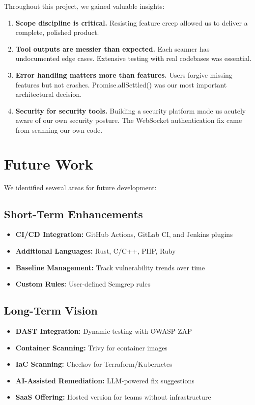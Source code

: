 \documentclass[12pt,a4paper]{report}
\begin{document}
Throughout this project, we gained valuable insights:

\begin{enumerate}
    \item \textbf{Scope discipline is critical.} Resisting feature creep allowed us to deliver a complete, polished product.

    \item \textbf{Tool outputs are messier than expected.} Each scanner has undocumented edge cases. Extensive testing with real codebases was essential.

    \item \textbf{Error handling matters more than features.} Users forgive missing features but not crashes. Promise.allSettled() was our most important architectural decision.

    \item \textbf{Security for security tools.} Building a security platform made us acutely aware of our own security posture. The WebSocket authentication fix came from scanning our own code.
\end{enumerate}

\section{Future Work}

We identified several areas for future development:

\subsection{Short-Term Enhancements}

\begin{itemize}
    \item \textbf{CI/CD Integration:} GitHub Actions, GitLab CI, and Jenkins plugins
    \item \textbf{Additional Languages:} Rust, C/C++, PHP, Ruby
    \item \textbf{Baseline Management:} Track vulnerability trends over time
    \item \textbf{Custom Rules:} User-defined Semgrep rules
\end{itemize}

\subsection{Long-Term Vision}

\begin{itemize}
    \item \textbf{DAST Integration:} Dynamic testing with OWASP ZAP
    \item \textbf{Container Scanning:} Trivy for container images
    \item \textbf{IaC Scanning:} Checkov for Terraform/Kubernetes
    \item \textbf{AI-Assisted Remediation:} LLM-powered fix suggestions
    \item \textbf{SaaS Offering:} Hosted version for teams without infrastructure
\end{itemize}
\end{document}
